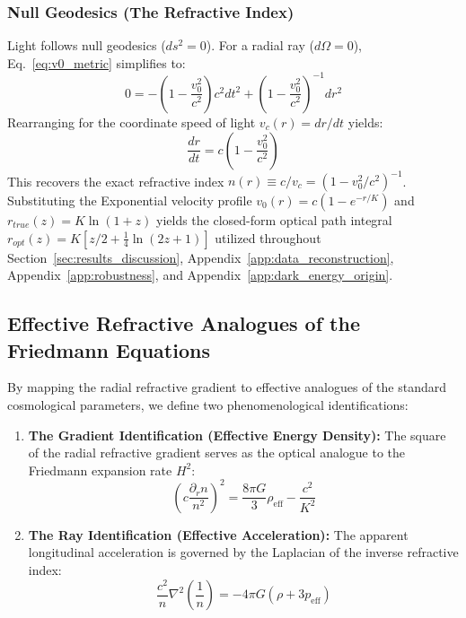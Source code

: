 \documentclass[11pt]{article}
\begin{document}
\subsubsection{Null Geodesics (The Refractive Index)}
Light follows null geodesics ($ds^2 = 0$). For a radial ray ($d\Omega=0$), Eq.~\ref{eq:v0_metric} simplifies to:
\begin{equation}
    0 = -\left(1 - \frac{v_0^2}{c^2}\right) c^2 dt^2 + \left(1 - \frac{v_0^2}{c^2}\right)^{-1} dr^2
\end{equation}
Rearranging for the coordinate speed of light $v_c(r) = dr/dt$ yields:
\begin{equation}
    \frac{dr}{dt} = c \left( 1 - \frac{v_0^2}{c^2} \right)
\end{equation}
This recovers the exact refractive index $n(r) \equiv c/v_c = (1 - v_0^2/c^2)^{-1}$. Substituting the Exponential velocity profile $v_0(r) = c(1 - e^{-r/K})$ and $r_{true}(z) = K\ln(1+z)$ yields the closed-form optical path integral $r_{opt}(z) = K[z/2 + \frac{1}{4}\ln(2z+1)]$ utilized throughout Section~\ref{sec:results_discussion}, Appendix~\ref{app:data_reconstruction}, Appendix~\ref{app:robustness}, and Appendix~\ref{app:dark_energy_origin}.

\subsection{Effective Refractive Analogues of the Friedmann Equations}
By mapping the radial refractive gradient to effective analogues of the standard cosmological parameters, we define two phenomenological identifications:

\begin{enumerate}
    \item \textbf{The Gradient Identification (Effective Energy Density):}
    The square of the radial refractive gradient serves as the optical analogue to the Friedmann expansion rate $H^2$:
    \begin{equation}
        \left( c \frac{\partial_r n}{n^2} \right)^2 = \frac{8\pi G}{3} \rho_{\text{eff}} - \frac{c^2}{K^2}
    \end{equation}

    \item \textbf{The Ray Identification (Effective Acceleration):}
    The apparent longitudinal acceleration is governed by the Laplacian of the inverse refractive index:
    \begin{equation}
        \frac{c^2}{n} \nabla^2 \left( \frac{1}{n} \right) = -4\pi G (\rho + 3p_{\text{eff}})
    \end{equation}
\end{enumerate}
\end{document}
